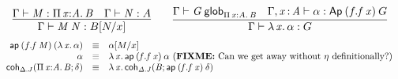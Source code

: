 \begin{small}
  \[
  \infer{\ofglob{\Gamma}{\app{M}{N}}{\subst{B}{N}{x}}}
  {\ofglob{\Gamma}{M}{\picl{x}{A}{B}} & \ofglob{\Gamma}{N}{A}} \qquad
  \infer{\ofglob{\Gamma}{\ulam{x}{\alpha}}{G}}
  {\wfglob{\Gamma}{G}{n}{\picl{x}{A}{B}} &
    \ofglob{\Gamma,\tptm{x}{A}}{\alpha}{\Apn{n}{(f.\app{f}{x})}{G}}}
  \]
\[
  \begin{array}{rcl}
  \apn{n}{(f.\app f M)}{(\ulam{x}{\alpha})} & \equiv & \tsubst{\alpha}{M/x} \\

\alpha & \equiv & \ulam{x}{\apn{n}{(f.\app f x)}{\alpha}} \text{ (\FIXME{Can we get away without $\eta$ definitionally?})} \\

\coh{\Delta.J}{\picl{x}{A}{B}}{\delta} & \equiv & \ulam{x}{\coh{\Delta.J}{B}{\apn{}{(f.\app f x)}{\delta}}} \\
 
\end{array}
\]
\end{small}
%






%















